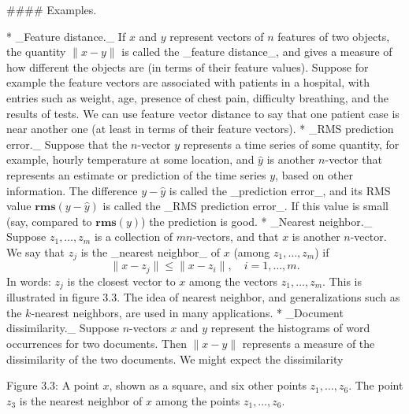 

#### Examples.

* _Feature distance._ If \(x\) and \(y\) represent vectors of \(n\) features of two objects, the quantity \(\|x-y\|\) is called the _feature distance_, and gives a measure of how different the objects are (in terms of their feature values). Suppose for example the feature vectors are associated with patients in a hospital, with entries such as weight, age, presence of chest pain, difficulty breathing, and the results of tests. We can use feature vector distance to say that one patient case is near another one (at least in terms of their feature vectors).
* _RMS prediction error._ Suppose that the \(n\)-vector \(y\) represents a time series of some quantity, for example, hourly temperature at some location, and \(\hat{y}\) is another \(n\)-vector that represents an estimate or prediction of the time series \(y\), based on other information. The difference \(y-\hat{y}\) is called the _prediction error_, and its RMS value \(\mathbf{rms}(y-\hat{y})\) is called the _RMS prediction error_. If this value is small (say, compared to \(\mathbf{rms}(y)\)) the prediction is good.
* _Nearest neighbor._ Suppose \(z_{1},\ldots,z_{m}\) is a collection of \(m\)\(n\)-vectors, and that \(x\) is another \(n\)-vector. We say that \(z_{j}\) is the _nearest neighbor_ of \(x\) (among \(z_{1},\ldots,z_{m}\)) if \[\|x-z_{j}\|\leq\|x-z_{i}\|,\quad i=1,\ldots,m.\] In words: \(z_{j}\) is the closest vector to \(x\) among the vectors \(z_{1},\ldots,z_{m}\). This is illustrated in figure 3.3. The idea of nearest neighbor, and generalizations such as the \(k\)-nearest neighbors, are used in many applications.
* _Document dissimilarity._ Suppose \(n\)-vectors \(x\) and \(y\) represent the histograms of word occurrences for two documents. Then \(\|x-y\|\) represents a measure of the dissimilarity of the two documents. We might expect the dissimilarity

Figure 3.3: A point \(x\), shown as a square, and six other points \(z_{1},\ldots,z_{6}\). The point \(z_{3}\) is the nearest neighbor of \(x\) among the points \(z_{1},\ldots,z_{6}\).

